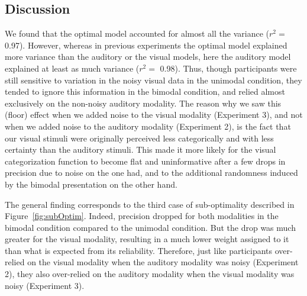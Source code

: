 \documentclass[english,floatsintext,man]{apa6}
\theoremstyle{definition}
\theoremstyle{definition}
\theoremstyle{definition}
\theoremstyle{remark}
\begin{document}
\subsection{Discussion}\label{discussion-2}

We found that the optimal model accounted for almost all the variance
(\(r^2 =\) 0.97). However, whereas in previous experiments the optimal
model explained more variance than the auditory or the visual models,
here the auditory model explained at least as much variance (\(r^2 =\)
0.98). Thus, though participants were still sensitive to variation in
the noisy visual data in the unimodal condition, they tended to ignore
this information in the bimodal condition, and relied almost exclusively
on the non-noisy auditory modality. The reason why we saw this (floor)
effect when we added noise to the visual modality (Experiment 3), and
not when we added noise to the auditory modality (Experiment 2), is the
fact that our visual stimuli were originally perceived less
categorically and with less certainty than the auditory stimuli. This
made it more likely for the visual categorization function to become
flat and uninformative after a few drops in precision due to noise on
the one had, and to the additional randomness induced by the bimodal
presentation on the other hand.

The general finding corresponds to the third case of sub-optimality
described in Figure~\ref{fig:subOptim}. Indeed, precision dropped for
both modalities in the bimodal condition compared to the unimodal
condition. But the drop was much greater for the visual modality,
resulting in a much lower weight assigned to it than what is expected
from its reliability. Therefore, just like participants over-relied on
the visual modality when the auditory modality was noisy (Experiment 2),
they also over-relied on the auditory modality when the visual modality
was noisy (Experiment 3).
\end{document}
